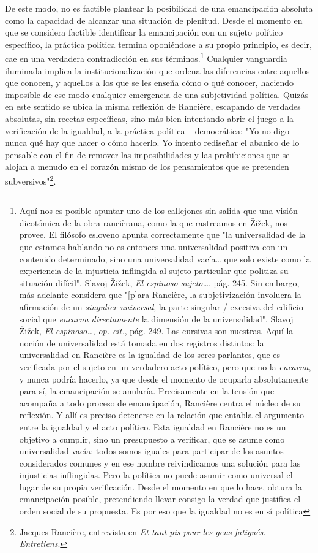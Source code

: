 \documentclass{book}
\begin{document}
De este modo, no es factible plantear la posibilidad de una emancipación
absoluta como la capacidad de alcanzar una situación de plenitud. Desde
el momento en que se considera factible identificar la emancipación con
un sujeto político específico, la práctica política termina oponiéndose
a su propio principio, es decir, cae en una verdadera contradicción en
sus términos.\footnote{Aquí nos es posible apuntar uno de los callejones
  sin salida que una visión dicotómica de la obra rancièrana, como la
  que rastreamos en Žižek, nos provee. El filósofo esloveno apunta
  correctamente que "la universalidad de la que estamos hablando no es
  entonces una universalidad positiva con un contenido determinado, sino
  una universalidad vacía\ldots{} que solo existe como la experiencia de
  la injusticia inflingida al sujeto particular que politiza su
  situación difícil". Slavoj Žižek, \emph{El espinoso sujeto\ldots{}},
  pág. 245. Sin embargo, más adelante considera que "{[}p{]}ara
  Rancière, la subjetivización involucra la afirmación de un
  \emph{singulier universal}, la parte singular / excesiva del edificio
  social que \emph{encarna directamente} la dimensión de la
  universalidad". Slavoj Žižek, \emph{El espinoso\ldots{}}, \emph{op.
  cit.}, pág. 249. Las cursivas son nuestras. Aquí la noción de
  universalidad está tomada en dos registros distintos: la universalidad
  en Rancière es la igualdad de los seres parlantes, que es verificada
  por el sujeto en un verdadero acto político, pero que no la
  \emph{encarna}, y nunca podría hacerlo, ya que desde el momento de
  ocuparla absolutamente para sí, la emancipación se anularía.
  Precisamente en la tensión que acompaña a todo proceso de
  emancipación, Rancière centra el núcleo de su reflexión. Y allí es
  preciso detenerse en la relación que entabla el argumento entre la
  igualdad y el acto político. Esta igualdad en Rancière no es un
  objetivo a cumplir, sino un presupuesto a verificar, que se asume como
  universalidad vacía: todos somos iguales para participar de los
  asuntos considerados comunes y en ese nombre reivindicamos una
  solución para las injusticias inflingidas. Pero la política no puede
  asumir como universal el lugar de su propia verificación. Desde el
  momento en que lo hace, obtura la emancipación posible, pretendiendo
  llevar consigo la verdad que justifica el orden social de su
  propuesta. Es por eso que la igualdad no es en sí política} Cualquier
vanguardia iluminada implica la institucionalización que ordena las
diferencias entre aquellos que conocen, y aquellos a los que se les
enseña cómo o qué conocer, haciendo imposible de ese modo cualquier
emergencia de una subjetividad política. Quizás en este sentido se ubica
la misma reflexión de Rancière, escapando de verdades absolutas, sin
recetas específicas, sino más bien intentando abrir el juego a la
verificación de la igualdad, a la práctica política -- democrática: "Yo
no digo nunca qué hay que hacer o cómo hacerlo. Yo intento rediseñar el
abanico de lo pensable con el fin de remover las imposibilidades y las
prohibiciones que se alojan a menudo en el corazón mismo de los
pensamientos que se pretenden subversivos"\footnote{Jacques Rancière,
  entrevista en \emph{Et tant pis pour les gens fatigués. Entretiens}.}.
\end{document}
